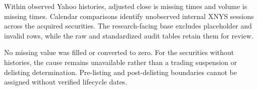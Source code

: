 
Within observed Yahoo histories, adjusted close is missing \MissingAdjClose{} times and volume is missing \MissingVolume{} times. Calendar comparisons identify \UnobservedSessions{} unobserved internal XNYS sessions across the acquired securities. The research-facing base excludes placeholder and invalid rows, while the raw and standardized audit tables retain them for review.

No missing value was filled or converted to zero. For the \YahooFailed{} securities without histories, the cause remains unavailable rather than a trading suspension or delisting determination. Pre-listing and post-delisting boundaries cannot be assigned without verified lifecycle dates.
